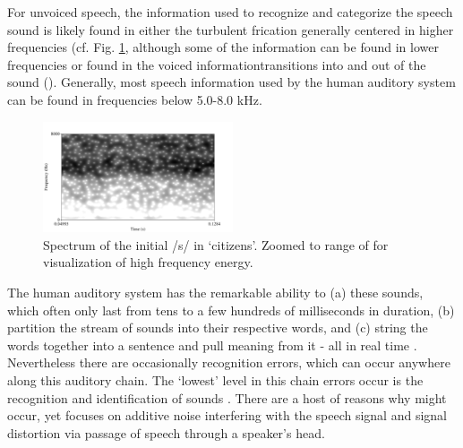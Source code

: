 For unvoiced speech, the information used to recognize and categorize the speech sound is likely found in either the turbulent frication generally centered in higher frequencies (cf. Fig. \ref{fig:spctgrm_s}\DIFaddbegin \DIFadd{)}\DIFaddend , although some of the information can be found in lower frequencies \DIFdelbegin \DIFdel{), }\DIFdelend or found in the voiced information\DIFdelbegin {}\DIFdelend \DIFaddbegin {}\DIFaddend transitions into and out of the sound (\cite{halle:57,lindblom:63,stevens:78,willi:17}).  Generally, most speech information used by the human auditory system can be found in frequencies below 5.0-8.0 kHz.
%
\begin{figure}
\centering
  \includegraphics[width=0.5\textwidth]{figure/spctgrm_s.png}
  \caption{Spectrum of the initial /s/ in `citizens'. Zoomed to range of \DIFdelbegin {}\DIFdelend \DIFaddbegin {}\DIFaddend for visualization of high frequency energy.}
  \label{fig:spctgrm_s}
\end{figure}

The human auditory system \DIFaddbegin {}\DIFaddend has the remarkable ability to (a) \DIFdelbegin {}\DIFdelend \DIFaddbegin {}\DIFaddend these sounds, which often only last from tens to a few hundreds of milliseconds in duration, (b) partition the stream of sounds into their respective words, and (c) string the words together into a sentence and pull meaning from it - all in real time \DIFaddbegin {}\DIFaddend .  Nevertheless there are occasionally recognition errors, which can occur anywhere along this auditory chain.  The `lowest' level in this chain \DIFdelbegin {}\DIFdelend \DIFaddbegin {}\DIFaddend errors occur is the recognition and identification of sounds \DIFaddbegin {}\DIFaddend .  There are a host of reasons why \DIFdelbegin {}\DIFdelend \DIFaddbegin {}\DIFaddend might occur, yet \DIFdelbegin {}\DIFdelend \DIFaddbegin {}\DIFaddend focuses on additive noise interfering with the speech signal and signal distortion via passage of speech through a speaker's head.

